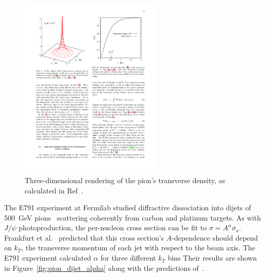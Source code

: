 \begin{figure}[!h]
    \centering
    \includegraphics[width=0.6\textwidth]{chap2/pion_charge_density.pdf}
    \caption{Three-dimensional rendering of the pion's transverse density, as
             calculated in Ref~\cite{Miller_2011}.
            }
    \label{fig:pion_charge_density}
\end{figure}


The E791 experiment at Fermilab studied diffractive dissociation into dijets of
\SI{500}{\giga\electronvolt} pions~\cite{Aitala_2001_1, Aitala_2001_2}
scattering coherently from carbon and platinum targets.
As with $J/\psi$ photoproduction, the per-nucleon cross section can be fit to
$\sigma = A^\alpha\sigma_a$.
Frankfurt et al.~\cite{Frankfurt_1993} predicted that this cross section's
$A$-dependence should depend on $k_T$, the transverse momentum of each jet with
respect to the beam axis.
The E791 experiment calculated $\alpha$ for three different $k_T$ bins
Their results are shown in Figure~\ref{fig:pion_dijet_alpha} along with the
predictions of~\cite{Frankfurt_1993}.


